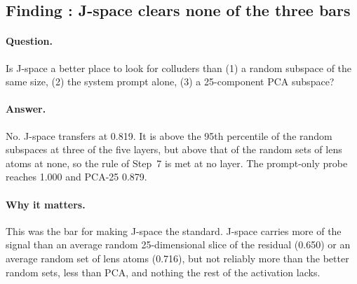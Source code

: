 \documentclass[11pt]{article}
\newcounter{finding}
\newcommand{\findingbreak}{}
\begin{document}
\findingbreak
{}\label{f:baselines}
\subsection{Finding \thefinding: J-space clears none of the three bars}

\paragraph{Question.} Is J-space a better place to look for colluders than (1) a random subspace of the same size, (2) the
system prompt alone, (3) a 25-component PCA subspace?

\paragraph{Answer.} No. J-space transfers at 0.819. It is above the 95th percentile of the random subspaces at three of
the five layers, but above that of the random sets of lens atoms at none, so the rule of Step~7 is met at no layer. The
prompt-only probe reaches 1.000 and PCA-25 0.879.

\paragraph{Why it matters.} This was the bar for making J-space the standard. J-space carries more of the signal than an
average random 25-dimensional slice of the residual (0.650) or an average random set of lens atoms (0.716), but not
reliably more than the better random sets, less than PCA, and nothing the rest of the activation lacks.

\begin{table}[H]\centering\small

\caption{The scoreboard. Core$\to$Transfer primary AUROC, original condition, last token, $k=25$, band mean. Each null
has 200 draws; they average 0.650 (subspaces) and 0.716 (lens atoms). ``Above it?'' compares the band means; the last
column lists the layers at which J-space scores above the baseline. The rule of Step~7 needs both nulls at the same layer.
For reference: full residual 0.945; residual with J-space removed (complement) 0.946.}
\label{tab:scoreboard}
\end{table}
\end{document}
